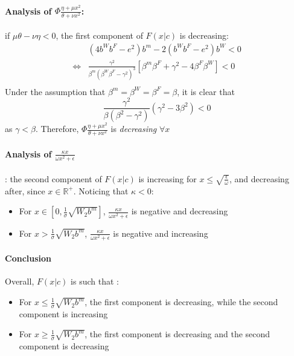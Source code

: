 \paragraph{Analysis of $\Phi \frac{\eta + \mu x^2}{\theta + \nu x^2}$:} if $\mu \theta - \nu \eta<0$, the first component of $F(x|c)$ is decreasing:
\begin{align*}
&(4b^Wb^F - e^2)b^m -2(b^Wb^F-e^2)b^W<0\\
\iff & \frac{\gamma^2}{\beta^m (\beta^W\beta^F - \gamma^2)^3}\left[ \beta^m \beta^F + \gamma^2 -4\beta^F \beta^W \right]<0\\
\end{align*}
Under the assumption that $\beta^m = \beta^W = \beta^F = \beta$, it is clear that 
$$
\frac{\gamma^2}{\beta(\beta^2 - \gamma^2)}(\gamma^2 - 3 \beta^2) <0
$$
as $\gamma < \beta$. 
Therefore, $\Phi \frac{\eta + \mu x^2}{\theta + \nu x^2}$ is \textit{decreasing} $\forall x$
\paragraph{Analysis of $\frac{\kappa x}{\omega x^2 + \epsilon}$}: the second component of $F(x|c)$ is increasing for $x \leq \sqrt{\frac{\epsilon}{\omega}}$, and decreasing after, since $x\in \mathbb{R}^+$. Noticing that $\kappa <0$: 
\begin{itemize}
    \item For $x \in \left[0,\frac{1}{\sigma}\sqrt{W_2 b^m} \right]$, $\frac{\kappa x}{\omega x^2 + \epsilon}$ is negative and decreasing
    \item For $x>\frac{1}{\sigma}\sqrt{W_2 b^m}$, $\frac{\kappa x}{\omega x^2 + \epsilon}$ is negative and increasing
\end{itemize}

\paragraph{Conclusion}
Overall, $F(x|c)$ is such that : 
\begin{itemize}
    \item For $x \leq \frac{1}{\sigma}\sqrt{W_2 b^m}$, the first component is decreasing, while the second component is increasing
    \item For $x \geq \frac{1}{\sigma}\sqrt{W_2 b^m}$, the first component is decreasing and the second component is decreasing
\end{itemize}

